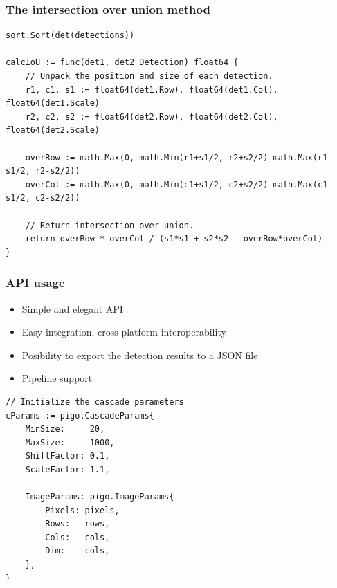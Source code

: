 \documentclass[9pt]{beamer}
\begin{document}
\begin{frame}[fragile]
\frametitle{The intersection over union method}



\begin{verbatim}
sort.Sort(det(detections))

calcIoU := func(det1, det2 Detection) float64 {
    // Unpack the position and size of each detection.
    r1, c1, s1 := float64(det1.Row), float64(det1.Col), float64(det1.Scale)
    r2, c2, s2 := float64(det2.Row), float64(det2.Col), float64(det2.Scale)

    overRow := math.Max(0, math.Min(r1+s1/2, r2+s2/2)-math.Max(r1-s1/2, r2-s2/2))
    overCol := math.Max(0, math.Min(c1+s1/2, c2+s2/2)-math.Max(c1-s1/2, c2-s2/2))

    // Return intersection over union.
    return overRow * overCol / (s1*s1 + s2*s2 - overRow*overCol)
}

\end{verbatim}



\end{frame}

\begin{frame}[fragile]
\frametitle{API usage}


\begin{itemize}
\item Simple and elegant API
\item Easy integration, cross platform interoperability
\item Posibility to export the detection results to a JSON file
\item Pipeline support
\end{itemize}


\begin{verbatim}
// Initialize the cascade parameters
cParams := pigo.CascadeParams{
    MinSize:     20,
    MaxSize:     1000,
    ShiftFactor: 0.1,
    ScaleFactor: 1.1,

    ImageParams: pigo.ImageParams{
        Pixels: pixels,
        Rows:   rows,
        Cols:   cols,
        Dim:    cols,
    },
}

\end{verbatim}



\end{frame}
\end{document}
